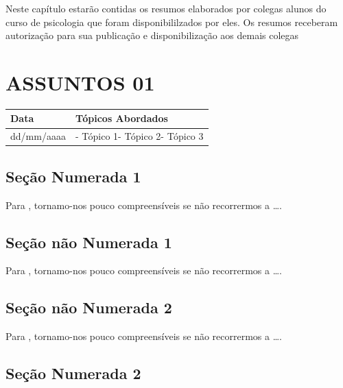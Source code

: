 \documentclass[
]{book}
\begin{document}
Neste capítulo estarão contidas os resumos elaborados por colegas alunos do curso de psicologia que foram disponibililzados por eles. Os resumos receberam autorização para sua publicação e disponibilização aos demais colegas

\hypertarget{assuntos-01}{%
\section{ASSUNTOS 01}\label{assuntos-01}}

\begin{longtable}[]{@{}ll@{}}
\toprule()
Data & Tópicos Abordados \\
\midrule()
\endhead
dd/mm/aaaa & - Tópico 1- Tópico 2- Tópico 3 \\
\bottomrule()
\end{longtable}

\hypertarget{seuxe7uxe3o-numerada-1-4}{%
\subsection{Seção Numerada 1}\label{seuxe7uxe3o-numerada-1-4}}

Para \citet{BOCK2001}, tornamo-nos pouco compreensíveis se não recorrermos a \ldots.

\hypertarget{seuxe7uxe3o-nuxe3o-numerada-1-8}{%
\subsection*{Seção não Numerada 1}\label{seuxe7uxe3o-nuxe3o-numerada-1-8}}

Para \citet{BOCK2001}, tornamo-nos pouco compreensíveis se não recorrermos a \ldots.

\hypertarget{seuxe7uxe3o-nuxe3o-numerada-2-12}{%
\subsection*{Seção não Numerada 2}\label{seuxe7uxe3o-nuxe3o-numerada-2-12}}

Para \citet{BOCK2001}, tornamo-nos pouco compreensíveis se não recorrermos a \ldots.

\hypertarget{seuxe7uxe3o-numerada-2-4}{%
\subsection{Seção Numerada 2}\label{seuxe7uxe3o-numerada-2-4}}
\end{document}
